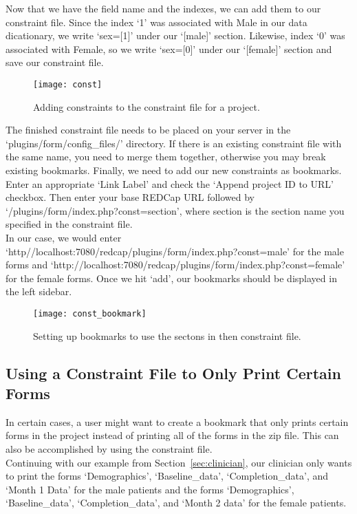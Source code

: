 \documentclass[12pt]{article}
\begin{document}
	Now that we have the field name and the indexes, we can add them to our constraint file. Since the index `1' was associated with Male in our data dicationary, we write `sex=[1]' under our `[male]' section. Likewise, index `0' was associated with Female, so we write `sex=[0]' under our `[female]' section and save our constraint file.
	 \begin{figure}[H]
            \centering
            \texttt{[image: const]}
   	    \caption{Adding constraints to the constraint file for a project.}
            \label{fig:const_sec}
        \end{figure}
         The finished constraint file needs to be placed on your server in the `plugins/form/config\_files/' directory. If there is an existing constraint file with the same name, you need to merge them together, otherwise you may break existing bookmarks.
	\newpage
	Finally, we need to add our new constraints as bookmarks. Enter an appropriate `Link Label' and check the `Append project ID to URL' checkbox. Then enter your base REDCap URL followed by `/plugins/form/index.php?const=section', where section is the section name you specified in the constraint file.
\\

 In our case, we would enter `http//localhost:7080/redcap/plugins/form/index.php?const=male' for the male forms and `http://localhost:7080/redcap/plugins/form/index.php?const=female' for the female forms. Once we hit `add', our bookmarks should be displayed in the left sidebar.
 	\begin{figure}[H]
            \centering
            \texttt{[image: const\_bookmark]}
	    \caption{Setting up bookmarks to use the sectons in then constraint file.}
            \label{fig:const_url}
	\end{figure}
    
    \subsection{Using a Constraint File to Only Print Certain Forms}\label{sec:print_forms}
    	In certain cases, a user might want to create a bookmark that only prints certain forms in the project instead of printing all of the forms in the zip file. This can also be accomplished by using the constraint file. 
\\

     	Continuing with our example from Section~\ref{sec:clinician}, our clinician only wants to print the forms `Demographics', `Baseline\_data', `Completion\_data', and `Month 1 Data' for the male patients and the forms `Demographics', `Baseline\_data', `Completion\_data', and `Month 2 data' for the female patients. 
\\
\end{document}
